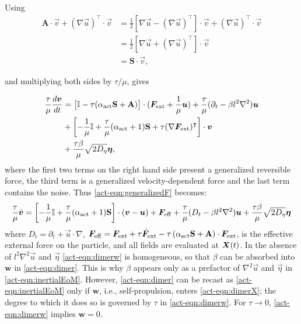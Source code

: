 \documentclass[../Rajarshi-thesis-draft.tex]{subfiles}
\begin{document}
Using
 \begin{align*}
    \mathbf{A} \cdot \vec{v} + (\nabla \vec{u})^{\intercal} \cdot \vec{v} & = \frac{1}{2} \left[ \nabla \vec{u} - (\nabla \vec{u})^{\intercal}\right] \cdot \vec{v} + (\nabla \vec{u})^{\intercal} \cdot \vec{v} \\
    & = \frac{1}{2} \left[ \nabla \vec{u} + (\nabla \vec{u})^{\intercal}\right] \cdot \vec{v} \\
    & =  \mathbf{S} \cdot \vec{v},
 \end{align*}
 
and multiplying both sides by $\tau/\mu$, gives

\begin{align}
\frac{\tau}{\mu} \frac{d \vec{v}}{dt} & = \left[\mathbb{I} - \tau (\alpha_{\rm act} \mathbf{S} + \mathbf{A})\right]\cdot (\vec{F}_{\rm ext} + \frac{1}{\mu} \vec{u}) + \frac{\tau}{\mu}( \partial_{t} - {\beta l^2} \nabla^{2}) \vec{u} \nonumber \\
& + \left[ -\frac{1}{\mu} \mathbb{I} + \frac{\tau}{\mu} (\alpha_{\rm act} + 1 ) \mathbf{S} + \tau (\nabla \vec{F}_{\rm ext})^{\intercal}\right] \cdot \vec{v} \nonumber \\
& + \frac{\tau \beta}{\mu} \sqrt{2D_\eta} \vec{\eta},
\label{act-eqn:generalizedF}
\end{align}
where the first two terms on the right hand side present a generalized reversible force, the third term is a generalized velocity-dependent force and the last term contains the noise. Thus \eqref{act-eqn:generalizedF} becomes: 
\begin{equation}
\label{act-eqn:inertialEoM}
\frac{\tau}{\mu} \dot{\vec{v}}  = \left[-\frac{1}{\mu}\mathbb{I} + \frac{\tau}{\mu}(\alpha_{\rm act} + 1)\mathbf{S}  \right]\cdot(\vec{v} - \vec{u}) + \vec{F}_{\rm eff} + \frac{\tau}{\mu}(D_t - \beta l^2 \nabla^2)\vec{u} + \frac{\tau \beta}{\mu} \sqrt{2D_\eta} \vec{\eta}
\end{equation}
where $D_t = \partial_t + \vec{u} \cdot \nabla$, $\vec{F}_{\rm eff} = \vec{F}_{\rm ext} + \tau \dot{\vec{F}}_{\rm ext} - \tau \left( \alpha_{\rm act}\mathbf{S} + \mathbf{A} \right)\cdot\vec{F}_{\rm ext} $, is the effective external force on the particle, and all fields are evaluated at $\vect{X}(t)$. In the absence of $l^2 \nabla^2\vec{u}$ and $\vec{\eta}$ \eqref{act-eqn:dimerw} is homogeneous, so that $\beta$ can be absorbed into $\mathbf{w}$ in \eqref{act-eqn:dimer}. This is why $\beta$ appears only as a prefactor of $\nabla^2 \vec{u}$ and $\vec{\eta}$ in \eqref{act-eqn:inertialEoM}. However, \eqref{act-eqn:dimer} can be recast as \eqref{act-eqn:inertialEoM} only if $\mathbf{w}$, i.e., self-propulsion, enters \eqref{act-eqn:dimerX}; the degree to which it does so is governed by $\tau$ in \eqref{act-eqn:dimerw}. For $\tau \to 0$, \eqref{act-eqn:dimerw} implies $\mathbf{w} = 0$. 
\end{document}
